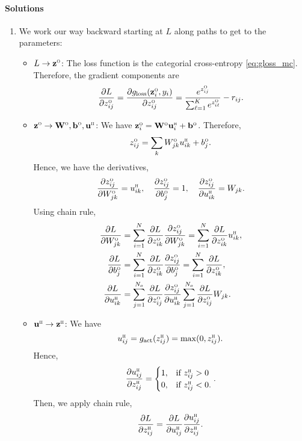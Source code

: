 \documentclass[11pt]{article}
\def\arr{\rightarrow}
\newcommand{\bbf}{\mathbf{b}}
\newcommand{\ubf}{\mathbf{u}}
\newcommand{\zbf}{\mathbf{z}}
\newcommand{\Wbf}{\mathbf{W}}
\def\hid{\textsc{\tiny H}}
\def\out{\textsc{\tiny O}}
\begin{document}
\paragraph*{Solutions}
\begin{enumerate}
\item  We work our way backward starting at $L$ along paths to get to the parameters:
\begin{itemize}
\item $L \arr \zbf^\out$:  The loss function is the categorial cross-entropy \eqref{eq:gloss_mc}.
Therefore, the gradient components are
\[
    \frac{\partial L}{\partial z^\out_{ij}} = \frac{\partial g_{\rm loss}(\zbf^\out_i,y_i)}{\partial z^\out_{ij}}
    = \frac{e^{z^\out_{ij}}}{\sum_{\ell=1}^K e^{z^\out_{i\ell}}} -  r_{ij}.
\]

\item $\zbf^\out \arr \Wbf^\out, \bbf^\out, \ubf^\hid$:
We have $\zbf^\out_i = \Wbf^\out \ubf^\hid_i + \bbf^\out$.  Therefore,
\[
    z^\out_{ij} = \sum_k W^\out_{jk}u^\hid_{ik} + b^\out_j.
\]
Hence, we have the derivatives,
\[
    \frac{\partial z^\out_{ij}}{\partial W^\out_{jk}} = u^\hid_{ik}, \quad
    \frac{\partial z^\out_{ij}}{\partial b^\out_{j}} = 1, \quad
    \frac{\partial z^\out_{ij}}{\partial u^\hid_{ik}} = W_{jk}.
\]
Using chain rule,
\begin{align*}
    \frac{\partial L}{\partial W^\out_{jk}} &= \sum_{i=1}^N \frac{\partial L}{\partial z^\out_{ik}}\frac{\partial z^\out_{ij}}{\partial W^\out_{jk}}
        = \sum_{i=1}^N \frac{\partial L}{\partial z^\out_{ik}}u^\hid_{ik}, \\
    \frac{\partial L}{\partial b^\out_{j}} &= \sum_{i=1}^N \frac{\partial L}{\partial z^\out_{ik}}\frac{\partial z^\out_{ij}}{\partial b^\out_{j}}
        = \sum_{i=1}^N \frac{\partial L}{\partial z^\out_{ik}}, \\
    \frac{\partial L}{\partial u^\hid_{ik}} &= \sum_{j=1}^{N_o} \frac{\partial L}{\partial z^\out_{ij}}\frac{\partial z^\out_{ij}}{\partial u^\hid_{ik}}
        \sum_{j=1}^{N_o} \frac{\partial L}{\partial z^\out_{ij}}W_{jk}.
\end{align*}

\item $\ubf^\hid \arr \zbf^\hid$: We have
\[
    u^\hid_{ij} = g_{\rm act}(z^\hid_{ij}) = \max(0, z^\hid_{ij}).
\]
Hence,
\[
    \frac{\partial u^\hid_{ij}}{\partial z^\hid_{ij}} = \begin{cases}
        1, & \mbox{if } z^\hid_{ij} > 0 \\
        0, & \mbox{if } z^\hid_{ij} < 0.
    \end{cases}.
\]
Then, we apply chain rule,
\[
    \frac{\partial L}{\partial z^\hid_{ij}}  = \frac{\partial L}{\partial u^\hid_{ij}}\frac{\partial u^\hid_{ij}}{\partial z^\hid_{ij}}.
\]


\end{itemize}
\end{enumerate}
\end{document}
